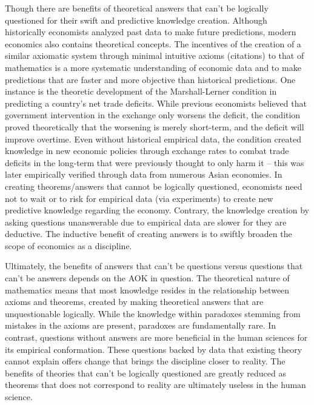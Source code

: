 \documentclass[a4paper,12pt]{article}
\begin{document}
Though there are benefits of theoretical answers that can’t be logically questioned for their swift and predictive knowledge creation. Although historically economists analyzed past data to make future predictions, modern economics also contains theoretical concepts. The incentives of the creation of a similar axiomatic system through minimal intuitive axioms (citations) to that of mathematics is a more systematic understanding of economic data and to make predictions that are faster and more objective than historical predictions. One instance is the theoretic development of the Marshall-Lerner condition in predicting a country’s net trade deficits. While previous economists believed that government intervention in the exchange only worsens the deficit, the condition proved theoretically that the worsening is merely short-term, and the deficit will improve overtime. Even without historical empirical data, the condition created knowledge in new economic policies through exchange rates to combat trade deficits in the long-term that were previously thought to only harm it – this was later empirically verified through data from numerous Asian economies. In creating theorems/answers that cannot be logically questioned, economists need not to wait or to risk for empirical data (via experiments) to create new predictive knowledge regarding the economy. Contrary, the knowledge creation by asking questions unanswerable due to empirical data are slower for they are deductive. The inductive benefit of creating answers is to swiftly broaden the scope of economics as a discipline.

Ultimately, the benefits of answers that can’t be questions versus questions that can’t be answers depends on the AOK in question. The theoretical nature of mathematics means that most knowledge resides in the relationship between axioms and theorems, created by making theoretical answers that are unquestionable logically. While the knowledge within paradoxes stemming from mistakes in the axioms are present, paradoxes are fundamentally rare. In contrast, questions without answers are more beneficial in the human sciences for its empirical conformation. These questions backed by data that existing theory cannot explain offers change that brings the discipline closer to reality. The benefits of theories that can’t be logically questioned are greatly reduced as theorems that does not correspond to reality are ultimately useless in the human science.



\newpage
\printbibliography
\end{document}

